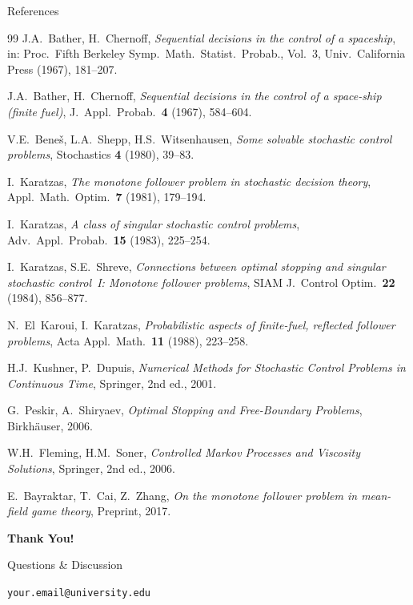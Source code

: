 \documentclass[11pt, aspectratio=169]{beamer}
\theoremstyle{plain}
\begin{document}
\begin{frame}[allowframebreaks]{References}
  \small
  \begin{thebibliography}{99}
    J.A.~Bather, H.~Chernoff,
    \emph{Sequential decisions in the control of a spaceship},
    in: Proc.\ Fifth Berkeley Symp.\ Math.\ Statist.\ Probab., Vol.~3,
    Univ.\ California Press (1967), 181--207.

    J.A.~Bather, H.~Chernoff,
    \emph{Sequential decisions in the control of a space-ship (finite fuel)},
    J.~Appl.\ Probab.\ \textbf{4} (1967), 584--604.

    V.E.~Bene\v{s}, L.A.~Shepp, H.S.~Witsenhausen,
    \emph{Some solvable stochastic control problems},
    Stochastics \textbf{4} (1980), 39--83.

    I.~Karatzas,
    \emph{The monotone follower problem in stochastic decision theory},
    Appl.\ Math.\ Optim.\ \textbf{7} (1981), 179--194.

    I.~Karatzas,
    \emph{A class of singular stochastic control problems},
    Adv.\ Appl.\ Probab.\ \textbf{15} (1983), 225--254.

    I.~Karatzas, S.E.~Shreve,
    \emph{Connections between optimal stopping and singular stochastic control~I: Monotone follower problems},
    SIAM J.~Control Optim.\ \textbf{22} (1984), 856--877.

    N.~El~Karoui, I.~Karatzas,
    \emph{Probabilistic aspects of finite-fuel, reflected follower problems},
    Acta Appl.\ Math.\ \textbf{11} (1988), 223--258.

    H.J.~Kushner, P.~Dupuis,
    \emph{Numerical Methods for Stochastic Control Problems in Continuous Time},
    Springer, 2nd ed., 2001.

    G.~Peskir, A.~Shiryaev,
    \emph{Optimal Stopping and Free-Boundary Problems},
    Birkh\"auser, 2006.

    W.H.~Fleming, H.M.~Soner,
    \emph{Controlled Markov Processes and Viscosity Solutions},
    Springer, 2nd ed., 2006.

    E.~Bayraktar, T.~Cai, Z.~Zhang,
    \emph{On the monotone follower problem in mean-field game theory},
    Preprint, 2017.
  \end{thebibliography}
\end{frame}

\begin{frame}
  \centering
  \vspace{1.5cm}
  {\Huge\bfseries Thank You!}

  \vspace{1cm}
  {\large Questions \& Discussion}

  \vspace{1cm}
  {\normalsize \texttt{your.email@university.edu}}
\end{frame}
\end{document}
